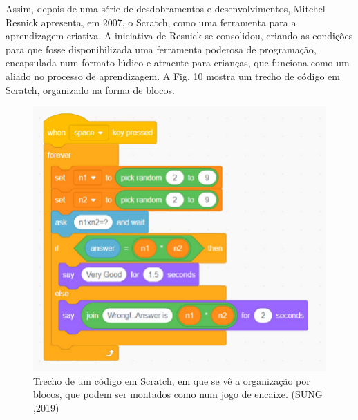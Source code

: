 \noindent\begin{center}\mbox{\centering{}}\end{center}


Assim, depois de uma série de desdobramentos e desenvolvimentos, Mitchel Resnick apresenta, em 2007, o Scratch, como uma ferramenta para a aprendizagem criativa. A iniciativa de Resnick se consolidou, criando as condições para que fosse disponibilizada uma ferramenta poderosa de programação, encapsulada num formato lúdico e atraente para crianças, que funciona como um aliado no processo de aprendizagem. A Fig. 10 mostra um trecho de código em Scratch, organizado na forma de blocos.



\captionsetup{format=plain}
\begin{figure}[htb]

\centering


\begin{minipage}[b]{0.4\linewidth}
        \centering
                \includegraphics[width=1.0\linewidth]{../../../imagens/Scratch-Block.png}
                \caption{Trecho de um código em Scratch, em que se vê a organização por blocos, que podem ser montados como num jogo de encaixe. (SUNG ,2019)}
                \label{5cac9c9edeb34a88b5571069bb494cda1ce1bd9c}
\end{minipage}%
\hspace{0.5cm}
\end{figure}



